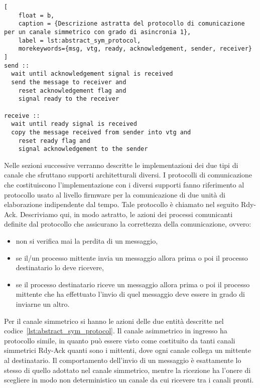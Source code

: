 \begin{lstlisting}[
    float = b,
    caption = {Descrizione astratta del protocollo di comunicazione per un canale simmetrico con grado di asincronia 1}, 
    label = lst:abstract_sym_protocol,
    morekeywords={msg, vtg, ready, acknowledgement, sender, receiver}
]
send ::
  wait until acknowledgement signal is received
  send the message to receiver and
    reset acknowledgement flag and
    signal ready to the receiver
  
receive ::
  wait until ready signal is received
  copy the message received from sender into vtg and
    reset ready flag and
    signal acknowledgement to the sender
\end{lstlisting}
Nelle sezioni successive verranno descritte le implementazioni dei due tipi di canale che sfruttano supporti architetturali diversi. I protocolli di comunicazione che costituiscono l'implementazione con i diversi supporti fanno riferimento al protocollo usato al livello firmware per la comunicazione di due unit\`a di elaborazione indipendente dal tempo. Tale protocollo \`e chiamato nel seguito Rdy-Ack. Descriviamo qui, in modo astratto, le azioni dei processi comunicanti definite dal protocollo che assicurano la correttezza della comunicazione, ovvero: 
\begin{itemize}
\item non si verifica mai la perdita di un messaggio,
\item se il/un processo mittente invia un messaggio allora prima o poi il processo destinatario lo deve ricevere,
\item se il processo destinatario riceve un messaggio allora prima o poi il processo mittente che ha effettuato l'invio di quel messaggio deve essere in grado di inviarne un altro.
\end{itemize}
Per il canale simmetrico si hanno le azioni delle due entit\`a descritte nel codice~\ref{lst:abstract_sym_protocol}. Il canale asimmetrico in ingresso ha protocollo simile, in quanto pu\`o essere visto come costituito da tanti canali simmetrici Rdy-Ack quanti sono i mittenti, dove ogni canale collega un mittente al destinatario. Il comportamento dell'invio di un messaggio \`e esattamente lo stesso di quello adottato nel canale simmetrico, mentre la ricezione ha l'onere di scegliere in modo non deterministico un canale da cui ricevere tra i canali pronti.



